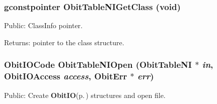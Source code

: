 \subsubsection{\setlength{\rightskip}{0pt plus 5cm}gconstpointer Obit\-Table\-NIGet\-Class (void)}\label{ObitTableNI_8h_a13}


Public: Class\-Info pointer. 

\begin{Desc}
\item[Returns:]pointer to the class structure. \end{Desc}
\subsubsection{\setlength{\rightskip}{0pt plus 5cm}Obit\-IOCode Obit\-Table\-NIOpen ({\bf Obit\-Table\-NI} $\ast$ {\em in}, Obit\-IOAccess {\em access}, {\bf Obit\-Err} $\ast$ {\em err})}\label{ObitTableNI_8h_a17}


Public: Create {\bf Obit\-IO}{\rm (p.\,\pageref{structObitIO})} structures and open file. 

